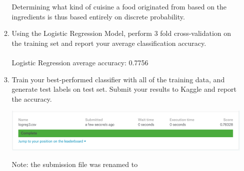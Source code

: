 \documentclass{report}
\begin{document}
\begin{enumerate}
\begin{enumerate}[label=(\alph*)]
Determining what kind of cuisine a food originated from based on the ingredients is thus based entirely on discrete probability.
		\item Using the Logistic Regression Model, perform 3 fold cross-validation on the training set and report your average classification accuracy. \\ \\
		Logistic Regression average accuracy: 0.7756
		\item Train your best-performed classifier with all of the training data, and generate test labels on test set. Submit your results to Kaggle and report the accuracy.
		\begin{center}
			\includegraphics[width=15cm]{images/kaggle_score.png}
		\end{center}
		Note: the submission file was renamed to 
	\end{enumerate}
\end{enumerate}

\newpage
\end{document}
